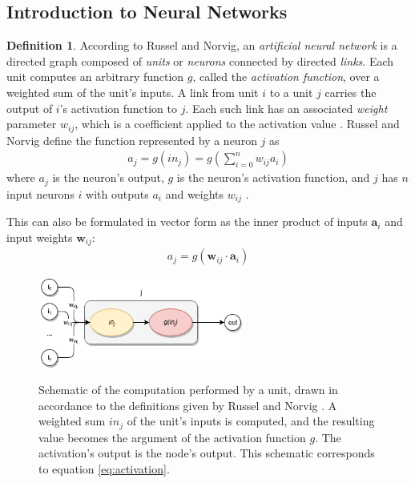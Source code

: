 \documentclass[12pt, titlepage]{report}
\theoremstyle{definition}
\newtheorem{definition}{Definition}
\begin{document}
\subsection{Introduction to Neural Networks}\label{subsection:neural_intro}
\begin{definition}
According to Russel and Norvig, an \emph{artificial neural network} is a directed graph composed of \emph{units} or \emph{neurons} connected by directed \emph{links}. Each unit computes an arbitrary function $g$, called the \emph{activation function}, over a weighted sum of the unit's inputs. A link from unit $i$ to a unit $j$ carries the output of $i$'s activation function to $j$. Each such link has an associated \emph{weight} parameter $w_{ij}$, which is a coefficient applied to the activation value \cite[p. 727-731]{russel2009artificial}. Russel and Norvig define the function represented by a neuron $j$ as
\begin{gather}\label{eq:activation}
a_j = g(in_j) = g\left(\sum_{i=0}^{n} w_{ij}a_i\right)
\end{gather}
where $a_j$ is the neuron's output, $g$ is the neuron's activation function, and $j$ has $n$ input neurons $i$ with outputs $a_i$ and weights $w_{ij}$ \cite[p. 728]{russel2009artificial}.
\end{definition}

This can also be formulated in vector form as the inner product of inputs $\bm{a}_i$ and input weights $\bm{w}_{ij}$:
\begin{gather}\label{eq:activation_vector}
a_j = g(\bm{w}_{ij}\cdot\bm{a}_i)
\end{gather}

\begin{figure}
\centering
\includegraphics[width=0.6\textwidth]{img/neuron.png}\\
\caption{Schematic of the computation performed by a unit, drawn in accordance to the definitions given by Russel and Norvig \cite[p.728]{russel2009artificial}. A weighted sum $in_j$ of the unit's inputs is computed, and the resulting value becomes the argument of the activation function $g$. The activation's output is the node's output. This schematic corresponds to equation \ref{eq:activation}.}
\label{figure:neural_unit}
\end{figure}
\end{document}

